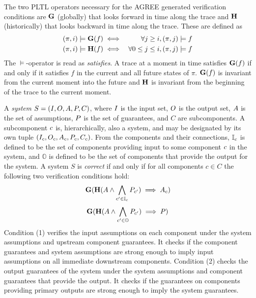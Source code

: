 The two PLTL operators necessary for the AGREE generated verification
conditions are $\mathbf{G}$ (globally) that looks forward in time along
the trace and $\mathbf{H}$ (historically) that looks backward in
time along the trace.  These are defined as
\begin{eqnarray*}
 (\pi, i) \models \mathbf{G}(f) & \iff & \forall j \ge i, (\pi, j) \models f \\
(\pi, i) \models \mathbf{H}(f) & \iff & \forall 0 \le j \le i, (\pi, j) \models f
\end{eqnarray*}
The $\models$-operator is read as \emph{satisfies}.  A trace at a
moment in time satisfies $\mathbf{G}(f)$ if and only if it satisfies
$f$ in the current and all future states of $\pi$.  $\mathbf{G}(f)$ is
invariant from the current moment into the future and $\mathbf{H}$ is
invariant from the beginning of the trace to the current moment.

A \emph{system} $S = (I, O, A,
P,C)$, where $I$ is the input set, $O$ is the
output set, $A$ is the set of assumptions, $P$ is the
set of guarantees, and $C$ are subcomponents.  A subcomponent
$c$ is, hierarchically, also a system, and may be designated
by its own tuple $(I_{c}, O_{c},
A_{c}, P_{c}, C_c)$.  From the
components and their connections, $\mathbb{I}_{c}$ is defined
to be the set of components providing input to some component
$c$ in the system, and $\mathbb{O}$ is defined to be the set
of components that provide the output for the system.  A system $S$ is
\emph{correct} if and only if for all components $c \in C$ the
following two verification conditions hold:
\begin{equation}
            \mathbf{G}(\mathbf{H}(A \wedge
            \bigwedge_{c^\prime \in \mathbb{I}_{c}} P_{c^\prime})
            \implies A_{c})
\end{equation}
\begin{equation}
            \mathbf{G}(\mathbf{H}(A \wedge
            \bigwedge_{c^\prime \in \mathbb{O}} P_{c^\prime})
            \implies P)
\end{equation}
Condition (1) verifies the input assumptions on each component under
the system assumptions and upstream component guarantees.  It checks
if the component guarantees and system assumptions are strong enough
to imply input assumptions on all immediate downstream components.
Condition (2) checks the output guarantees of the system under the
system assumptions and component guarantees that provide the output.
It checks if the guarantees on components providing primary outputs
are strong enough to imply the system guarantees.

